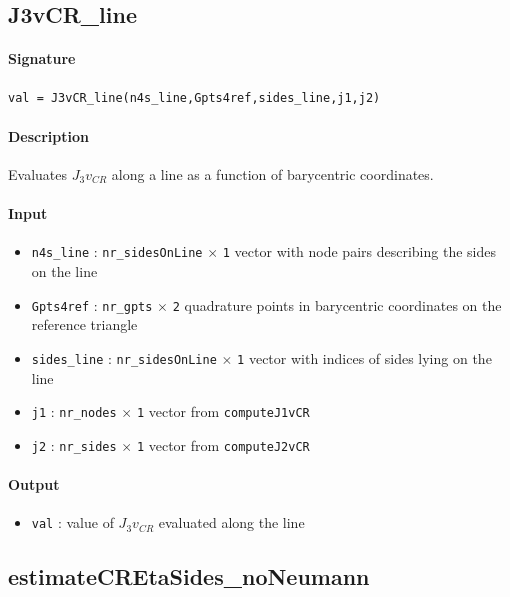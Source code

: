 \documentclass[11pt,a4paper]{article}
\newcommand{\matrixdim}[2]{\texttt{#1} $\times$ \texttt{#2}}
\begin{document}
\subsection{J3vCR\_line}

\paragraph{Signature}
\begin{verbatim}
val = J3vCR_line(n4s_line,Gpts4ref,sides_line,j1,j2)
\end{verbatim}

\paragraph{Description}
Evaluates $J_3 v_{CR}$ along a line as a function of barycentric coordinates.

\paragraph{Input}
\begin{itemize}
    \item \texttt{n4s\_line} : \matrixdim{nr\_sidesOnLine}{1} vector with node pairs describing the sides on the line
    \item \texttt{Gpts4ref} : \matrixdim{nr\_gpts}{2} quadrature points in barycentric coordinates on the reference triangle
    \item \texttt{sides\_line} : \matrixdim{nr\_sidesOnLine}{1} vector with indices of sides lying on the line
    \item \texttt{j1} : \matrixdim{nr\_nodes}{1} vector from \texttt{computeJ1vCR}
    \item \texttt{j2} : \matrixdim{nr\_sides}{1} vector from \texttt{computeJ2vCR}
\end{itemize}

\paragraph{Output}
\begin{itemize}
    \item \texttt{val} : value of $J_3 v_{CR}$ evaluated along the line
\end{itemize}

\subsection{estimateCREtaSides\_noNeumann}
\end{document}
